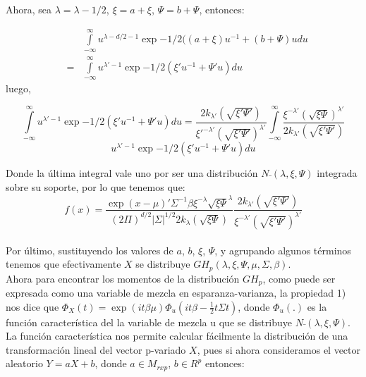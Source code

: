 Ahora, sea $\lambda\acute{}=\lambda- 1/2$, $\xi\acute{}=a+\xi$, $\Psi\acute{}=b+\Psi$, entonces:

\begin{eqnarray*}
& &\underset{-\infty }{\overset{\infty }{\int }}u^{\lambda -d/2 -1}\exp{-1/2((a+\xi)u^{-1}+(b+\Psi)u} du\\
&=&\underset{-\infty }{\overset{\infty }{\int }}u^{\lambda'-1}\exp{-1/2(\xi' u^{-1}+ \Psi'u)} du
\end{eqnarray*}
luego,

\begin{equation*}
\underset{-\infty }{\overset{\infty }{\int }}u^{\lambda'-1}\exp{-1/2(\xi' u^{-1}+ \Psi'u)} du=     \frac{2k_{\lambda'}(\sqrt{\xi'\Psi'})}{\xi'^{-\lambda'}(\sqrt{\xi'\Psi'})^{\lambda'}}   \underset{-\infty }{\overset{\infty }{\int }}\frac{\xi^{-\lambda'}(\sqrt{\xi\Psi})^{\lambda'}}{2k_{\lambda'}(\sqrt{\xi'\Psi'})}
\end{equation*}
\begin{equation*}
u^{\lambda'-1}\exp{-1/2(\xi' u^{-1}+ \Psi'u)} du
\end{equation*}

Donde la última integral vale uno por ser una distribución $N\bar{}(\lambda\acute{},\xi\acute{},\Psi\acute{})$ integrada sobre su soporte, por lo que tenemos que:\\

\begin{equation*}
f(x)=\frac{\exp{(x-\mu)'\Sigma^{-1}\beta}\xi^{-\lambda}\sqrt{\xi\Psi}^{\lambda}}{(2\Pi)^{d/2}|\Sigma|^{1/2}2k_{\lambda}(\sqrt{\xi\Psi})}\frac{2k_{\lambda'}(\sqrt{\xi'\Psi'})}{\xi^{-\lambda'}(\sqrt{\xi'\Psi'})^{\lambda'}}
\end{equation*}\\

Por último, sustituyendo los valores de $a$, $b$, $\xi\acute{}$, $\Psi\acute{}$, y agrupando algunos términos tenemos que efectivamente $X$ se distribuye $GH_{p}(\lambda,\xi,\Psi,\mu,\Sigma,\beta)$.\\

Ahora para encontrar los momentos de la distribución $GH_{p}$, como puede ser expresada como una variable de mezcla en esparanza-varianza, la propiedad 1) nos dice que $\Phi_{X}(t)=\exp(it\beta\mu\acute{})\Phi_{u}(it\beta\acute{}-\frac{1}{2}t\Sigma t\acute{})$, donde $\Phi_{u}(.)$ es la función característica del la variable de mezcla u que se distribuye $N\bar{}(\lambda,\xi,\Psi)$.\\

La función característica nos permite calcular fácilmente la distribución de una transformación lineal del vector p-variado $X$, pues si ahora consideramos el vector aleatorio $Y=aX+b$, donde $a\in M_{rxp}$, $b\in R^{p}$ entonces:

